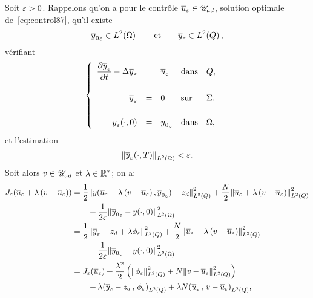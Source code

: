 Soit $\varepsilon > 0$. Rappelons qu'on a pour le contrôle ${\overline{u}}_{\varepsilon}\in{\mathscr{U}}_{ad}$,
solution optimale de~\eqref{eq:control87}, qu'il existe
\begin{equation*}
    {\overline{y}_{0}}_{\varepsilon}\in L^{2}\!\left({\Omega}\right)\qquad\text{et}\qquad
    {\overline{y}}_{\varepsilon}\in L^{2}\!\left({Q}\right),
\end{equation*}
vérifiant
\begin{equation*}
    \begin{cases}\displaystyle
        \begin{array}{rclll}
            \dfrac{\partial{}{\overline{y}}_{\varepsilon}}{\partial{}t} - \Delta{\overline{y}}_{\varepsilon} & = & {\overline{u}}_{\varepsilon} &
            \text{dans} & Q,\\
            \\
            {\overline{y}}_{\varepsilon} & = & 0 & \text{sur} & \Sigma,\\
            \\
            {{\overline{y}}_{\varepsilon}}\!\left({\cdot, 0}\right) & = & {\overline{y}_{0}}_{\varepsilon} &
            \text{dans} & \Omega,
        \end{array}
    \end{cases}
\end{equation*}
et l'estimation
\begin{equation*}
    {\left\|{ { {\overline{y}}_{\varepsilon} }\!\left({\cdot,T}\right)  }\right\|}_{L^{2}\left({\Omega}\right)} < \varepsilon.
\end{equation*}
Soit alors $v\in{\mathscr{U}}_{ad}$ et $\lambda\in{\mathbb{R}}^{*}$; on a:
\begin{equation*}
    \begin{split}
        J_{\veps}\!\left({%
            \bareps{u} + \lambda\left({v - \bareps{u}}\right)
        }\right) &= \dfrac{1}{2}\normecq{%
            y\!\left({%
                \bareps{u} + \lambda\left({v - \bareps{u}}\right),
                {\bar{y}_{0}}_{\veps}
            }\right) - z_{d}
        } + \dfrac{N}{2}\normecq{%
            \bareps{u} + \lambda\left({v - \bareps{u}}\right)
        }\\
        &\qquad + \dfrac{1}{2\veps}\normecohm{%
            {\bar{y}_{0}}_{\veps} - \condinitiale{y}
        }\\
        & = \dfrac{1}{2}\normecq{%
            \bareps{y} - z_{d} + \lambda{\fieps}
        } + \dfrac{N}{2}\normecq{%
            \bareps{u} + \lambda\left({v - \bareps{u}}\right)
        }\\
        &\qquad + \dfrac{1}{2\veps}\normecohm{%
            {\bar{y}_{0}}_{\veps} - \condinitiale{y}
        }\\
        & = J_{\veps}\!\left({\bareps{u}}\right) +
        \dfrac{{\lambda}^{2}}{2}\left({%
            \normecq{\fieps} + N\normecq{v - \bareps{u}}
        }\right)\\
        &\qquad + \lambda\scalaireq{%
            \bareps{y} - z_{d}
        }{%
            \fieps{}
        } + \lambda N\scalaireq{%
            \bareps{u}
        }{%
            v - \bareps{u}
        },
    \end{split}
\end{equation*}
